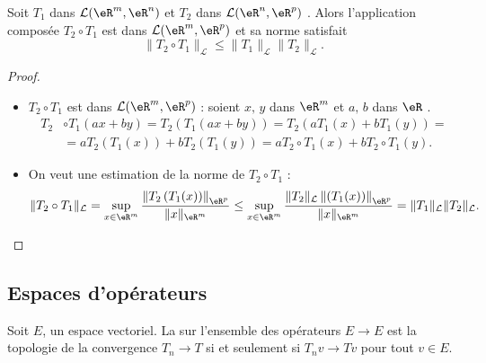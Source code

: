 \begin{proposition}
  Soit $T_1$ dans $\mathcal{L}(\eR^m, \eR^n)$ et $T_2$ dans $\mathcal{L}(\eR^n, \eR^p)$ . Alors l'application composée $T_2\circ T_1 $ est dans $\mathcal{L}(\eR^m, \eR^p)$ et sa norme satisfait
  \begin{equation}  \label{EqFwTvwI}
\|T_2\circ T_1 \|_{\mathcal{L}}\leq\|T_1\|_{\mathcal{L}} \|T_2\|_{\mathcal{L}}.
  \end{equation}
\end{proposition}
\begin{proof}
  \begin{itemize}
  \item $T_2\circ T_1 $ est dans $\mathcal{L}(\eR^m, \eR^p)$ : soient $x,\, y$ dans $\eR^m$ et $a,\, b$ dans $\eR$ . 
    \begin{equation}\nonumber
      \begin{aligned}
       T_2&\circ T_1 (ax+by)= T_2\left(T_1(ax+by)\right)=T_2(aT_1(x)+bT_1(y))=\\
&= aT_2\left(T_1(x)\right)+ bT_2\left(T_1(y)\right) = aT_2\circ T_1(x)+ bT_2\circ T_1(y). 
      \end{aligned}
    \end{equation}  
\item
	On veut une estimation de la norme de $T_2\circ T_1 $ :
\[
\|T_2\circ T_1 \|_{\mathcal{L}}= \sup_{x\in\eR^m}\frac{\left\|T_2\left(T_1(x)\right)\right\|_{\eR^p}}{\|x\|_{\eR^m}}\leq  \sup_{x\in\eR^m}\frac{\|T_2\|_{\mathcal{L}}\left\|\left(T_1(x)\right)\right\|_{\eR^p}}{\|x\|_{\eR^m}} =\|T_1\|_{\mathcal{L}} \|T_2\|_{\mathcal{L}}.
\]
  \end{itemize}
\end{proof}

\subsection{Espaces d'opérateurs}

Soit \( E\), un espace vectoriel. La  sur l'ensemble des opérateurs \( E\to E\) est la topologie de la convergence \( T_n\to T\) si et seulement si \( T_nv\to Tv\) pour tout \( v\in E\).

